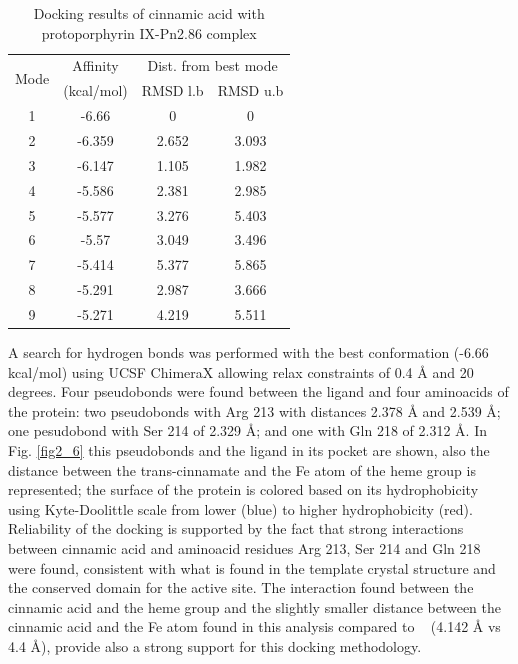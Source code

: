 \documentclass[12pt]{article}
\newcommand{\textcite}[1]{\citeauthor{#1}~\citeyear{#1}}
\begin{document}
	\begin{table}[h!]
		\centering
		\caption{\centering Docking results of cinnamic acid with protoporphyrin IX-Pn2.86 complex}
		\label{table2_2}
		\begin{tabular}{cccc}
			\toprule
			\multirow{2}{*}{Mode} & Affinity & \multicolumn{2}{c}{Dist. from best mode}\\
			&  (kcal/mol) & RMSD l.b & RMSD u.b\\
			\midrule
			1 &  -6.66   &       0   &         0\\
			2 & -6.359   &   2.652   &     3.093\\
			3 & -6.147   &   1.105   &     1.982\\
			4 & -5.586   &   2.381   &     2.985\\
			5 & -5.577   &   3.276   &     5.403\\
			6 &  -5.57   &   3.049   &     3.496\\
			7 & -5.414   &   5.377   &     5.865\\
			8 & -5.291   &   2.987   &     3.666\\
			9 & -5.271   &   4.219   &     5.511\\
			\bottomrule
			
		\end{tabular}
	\end{table}

	A search for hydrogen bonds was performed with the best conformation (-6.66 kcal/mol) using UCSF ChimeraX allowing relax constraints of 0.4 \r{A} and 20 degrees. \cite{chimera,chimera_2,hbond} Four pseudobonds were found between the ligand and four aminoacids of the protein: two pseudobonds with Arg 213 with distances 2.378 \r{A} and 2.539 \r{A}; one pesudobond with Ser 214 of 2.329 \r{A}; and one with Gln 218 of 2.312 \r{A}. In Fig. \ref{fig2_6} this pseudobonds and the ligand in its pocket are shown, also the distance between the trans-cinnamate and the Fe atom of the heme group is represented; the surface of the protein is colored based on its hydrophobicity using Kyte-Doolittle scale from lower (blue) to higher hydrophobicity (red). Reliability of the docking is supported by the fact that strong interactions between cinnamic acid and aminoacid residues Arg 213, Ser 214 and Gln 218 were found, consistent with what is found in the template crystal structure and the conserved domain for the active site. The interaction found between the cinnamic acid and the heme group and the slightly smaller distance between the cinnamic acid and the Fe atom found in this analysis compared to \textcite{cinnamate_oxygenase} (4.142 \r{A} vs 4.4 \r{A}), provide also a strong support for this docking methodology.
\end{document}
